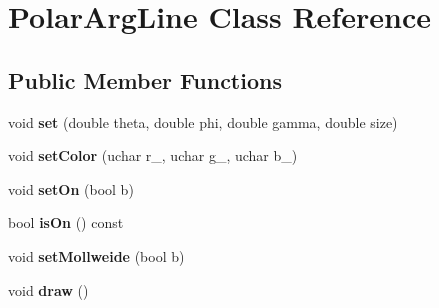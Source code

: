 \hypertarget{classPolarArgLine}{
\section{PolarArgLine Class Reference}
\label{classPolarArgLine}
}
\subsection*{Public Member Functions}
\begin{DoxyCompactItemize}
\item 
\hypertarget{classPolarArgLine_ab06a23fb4d01fdd39883d19c2082c095}{
void {\bfseries set} (double theta, double phi, double gamma, double size)}
\label{classPolarArgLine_ab06a23fb4d01fdd39883d19c2082c095}

\item 
\hypertarget{classPolarArgLine_a3f3a6aadd2f211953e18d3e8629ac919}{
void {\bfseries setColor} (uchar r\_, uchar g\_, uchar b\_)}
\label{classPolarArgLine_a3f3a6aadd2f211953e18d3e8629ac919}

\item 
\hypertarget{classPolarArgLine_a1d49b6f0b93b56be76bd8122d79cb918}{
void {\bfseries setOn} (bool b)}
\label{classPolarArgLine_a1d49b6f0b93b56be76bd8122d79cb918}

\item 
\hypertarget{classPolarArgLine_ab0173a55e86ad5ee439b1d287343ddd6}{
bool {\bfseries isOn} () const }
\label{classPolarArgLine_ab0173a55e86ad5ee439b1d287343ddd6}

\item 
\hypertarget{classPolarArgLine_a8c2e5c9eab6d1b3256d80d279dba8bcb}{
void {\bfseries setMollweide} (bool b)}
\label{classPolarArgLine_a8c2e5c9eab6d1b3256d80d279dba8bcb}

\item 
\hypertarget{classPolarArgLine_aff56b43396580d7e152324c0317b79f3}{
void {\bfseries draw} ()}
\label{classPolarArgLine_aff56b43396580d7e152324c0317b79f3}

\end{DoxyCompactItemize}
